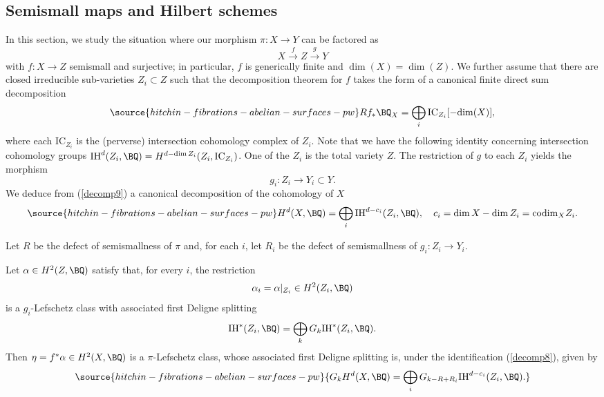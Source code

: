 \subsection{Semismall maps and Hilbert schemes}\label{Section3.4}
In this section, we study the situation where our morphism $\pi: X \to Y$ can be factored as
\[
X \xrightarrow{f} Z \xrightarrow{g} Y
\]
with $f: X \to Z$ semismall and surjective; in particular, $f$ is generically finite and $\dim (X)=\dim (Z)$. We further assume that there are closed irreducible sub-varieties $Z_i \subset Z$ such that the decomposition theorem for $f$ takes  the form of a canonical  finite direct sum decomposition
\begin{equation}\label{decomp9}
\source{hitchin-fibrations-abelian-surfaces-pw}
Rf_* \BQ_X = \bigoplus_i \mathrm{IC}_{Z_i}[-\mathrm{dim}(X)],
\end{equation}
where each $\mathrm{IC}_{Z_i}$ is the (perverse) intersection cohomology complex of $Z_i$. Note that we have the following identity concerning intersection cohomology groups
$\mathrm{IH}^d(Z_i, \BQ)=H^{d-\dim Z_i}(Z_i, \mathrm{IC}_{Z_i})$.
One of the $Z_i$ is the total variety $Z$. The restriction of $g$ to each $Z_i$ yields the morphism
\[
g_i: Z_i \to Y_i \subset Y.
\]
We deduce from (\ref{decomp9}) a canonical decomposition of the cohomology of $X$
\begin{equation}\label{decomp8}
\source{hitchin-fibrations-abelian-surfaces-pw}
H^d(X, \BQ) = \bigoplus_i \mathrm{IH}^{d-c_i}(Z_i, \BQ), {\quad c_i = \dim X - \dim Z_i={\rm codim}_X Z_i.}
\end{equation}

Let ${R}$ be the defect of semismallness of $\pi$ and, for each $i$, let ${R_i}$ be the defect of semismallness of $g_i:Z_i \to Y_i$.

\begin{prop}
\notready\label{proposition3.5}
Let  $\alpha \in H^2(Z, \BQ)$ satisfy that, for every $i$,   the restriction
\[
\alpha_i = \alpha|_{Z_i} \in H^2(Z_i, \BQ)
\]
is a $g_i$-Lefschetz class  with associated  first Deligne splitting
\[
\mathrm{IH}^*(Z_i, \BQ) = \bigoplus_k G_k \mathrm{IH}^*(Z_i, \BQ).
\]
Then $\eta = f^*\alpha \in H^2(X, \BQ)$ is a $\pi$-Lefschetz class, whose associated first Deligne splitting is,
under the identification (\ref{decomp8}), given by
\begin{equation}\label{decomp7}
\source{hitchin-fibrations-abelian-surfaces-pw}
{G_kH^d(X, \BQ) = \bigoplus_i G_{k-R+{R_i}}\mathrm{IH}^{d-c_i}(Z_i, \BQ).}
\end{equation}
\end{prop}

